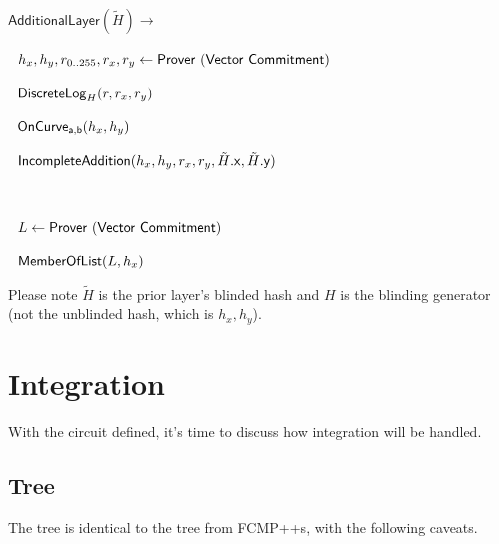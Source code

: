 \documentclass[]{article}
\begin{document}
$\mathsf{AdditionalLayer}(\tilde{H}) \rightarrow$

$~~h_x, h_y, r_{0..255}, r_x, r_y\leftarrow \mathsf{Prover ~(Vector ~Commitment)}$

$~~\mathsf{DiscreteLog}_H(r, r_x, r_y)$

$~~\mathsf{OnCurve_{a,b}}(h_x, h_y)$

$~~\mathsf{IncompleteAddition}(h_x, h_y, r_x, r_y, \tilde{H}\mathsf{.x}, \tilde{H}\mathsf{.y})$

$ $

$~~L\leftarrow \mathsf{Prover ~(Vector ~Commitment)}$

$~~\mathsf{MemberOfList}(L, h_x)$

Please note $\tilde{H}$ is the prior layer's blinded hash and $H$ is the blinding generator (not the unblinded hash, which is $h_x, h_y$).

\section{Integration}

With the circuit defined, it's time to discuss how integration will be handled.

\subsection{Tree}

The tree is identical to the tree from FCMP++s, with the following caveats.
\end{document}
